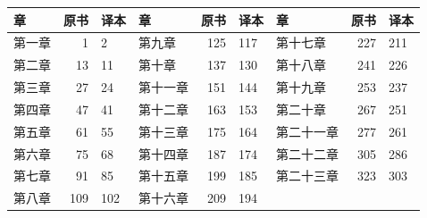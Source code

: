 \begin{center}\footnotesize
\begin{tabular}{lrl@{\qquad}lrl@{\qquad}lrl}
\toprule
 章 & 原书 & 译本 & 章 & 原书 & 译本 & 章 & 原书 & 译本 \\
\midrule
 第一章 & 1 & 2 & 第九章 & 125 & 117 & 第十七章 & 227 & 211 \\
 第二章 & 13 & 11 & 第十章 & 137 & 130 & 第十八章 & 241 & 226 \\
 第三章 & 27 & 24 & 第十一章 & 151 & 144 & 第十九章 & 253 & 237 \\
 第四章 & 47 & 41 & 第十二章 & 163 & 153 & 第二十章 & 267 & 251 \\
 第五章 & 61 & 55 & 第十三章 & 175 & 164 & 第二十一章 & 277 & 261 \\
 第六章 & 75 & 68 & 第十四章 & 187 & 174 & 第二十二章 & 305 & 286 \\
 第七章 & 91 & 85 & 第十五章 & 199 & 185 & 第二十三章 & 323 & 303 \\
 第八章 & 109 & 102 & 第十六章 & 209 & 194 &  &  &  \\
\bottomrule
\end{tabular}
\end{center}

